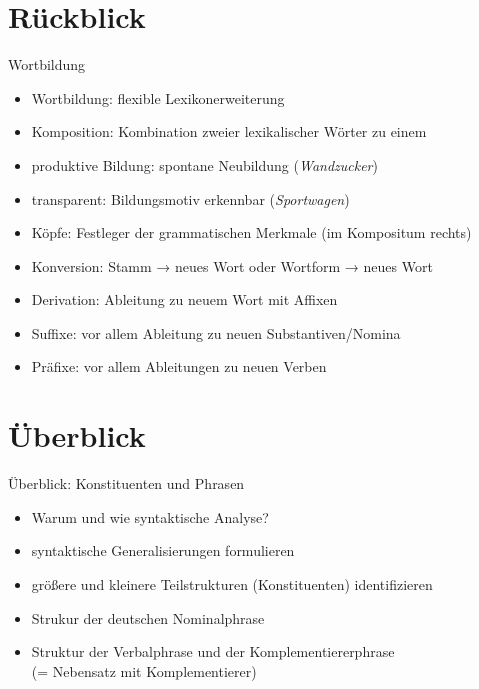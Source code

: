 \section{Rückblick}

\begin{frame}
  {Wortbildung}
  \pause
  \begin{itemize}[<+->]
    \item Wortbildung: flexible Lexikonerweiterung
      \Halbzeile
    \item Komposition: Kombination zweier lexikalischer Wörter zu einem
    \item produktive Bildung: spontane Neubildung (\textit{Wandzucker})
    \item transparent: Bildungsmotiv erkennbar (\textit{Sportwagen})
    \item Köpfe: Festleger der grammatischen Merkmale (im Kompositum rechts)
      \Halbzeile
    \item Konversion: Stamm → neues Wort oder Wortform → neues Wort
      \Halbzeile
    \item Derivation: Ableitung zu neuem Wort mit Affixen
    \item Suffixe: vor allem Ableitung zu neuen \alert{Substantiven}\slash Nomina
    \item Präfixe: vor allem Ableitungen zu neuen \alert{Verben}
  \end{itemize}
\end{frame}


\section{Überblick}

\begin{frame}
  {Überblick: Konstituenten und Phrasen}
  \pause
  \begin{itemize}[<+->]
    \item Warum und wie syntaktische Analyse?
    \item syntaktische Generalisierungen formulieren
    \item größere und kleinere Teilstrukturen (Konstituenten) identifizieren
      \Zeile
    \item Strukur der deutschen \alert{Nominalphrase}
    \item Struktur der Verbalphrase und der Komplementiererphrase\\
      (= Nebensatz mit Komplementierer)
  \end{itemize}
\end{frame}

